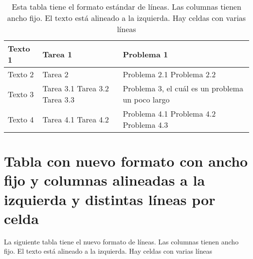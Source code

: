 \begin{table}[h]
	\centering
	\begin{tabular}{|>{\raggedright\arraybackslash}p{2cm}|>{\raggedright\arraybackslash}p{2.5cm}|>{\raggedright\arraybackslash}p{5cm}|}
		\hline
		Texto 1 & Tarea 1 & Problema 1 \\
		\hline
		Texto 2 & Tarea 2 & Problema 2.1 \newline Problema 2.2 \\
		\hline
		Texto 3 & Tarea 3.1 \newline Tarea 3.2 \newline Tarea 3.3 & Problema 3, el cuál es un problema un poco largo \\
		\hline
		Texto 4 & Tarea 4.1 \newline Tarea 4.2 & Problema 4.1 \newline Problema 4.2 \newline Problema 4.3 \\
		\hline
	\end{tabular}
	\caption[Tabla estándar con ancho fijo y columnas alineadas a la izquierda y distintas líneas por celda]{Esta tabla tiene el formato estándar de líneas. Las columnas tienen ancho fijo. El texto está alineado a la izquierda. Hay celdas con varias líneas}
	\label{table16}
\end{table}

\section*{Tabla con nuevo formato con ancho fijo y columnas alineadas a la izquierda y distintas líneas por celda}

La siguiente tabla tiene el nuevo formato de líneas. Las columnas tienen ancho fijo. El texto está alineado a la izquierda. Hay celdas con varias líneas

